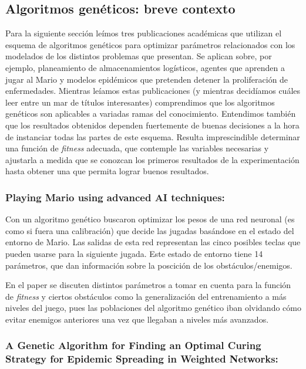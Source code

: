 \subsection{Algoritmos genéticos: breve contexto}

Para la siguiente sección leímos tres publicaciones académicas que utilizan el esquema de algoritmos genéticos para optimizar parámetros relacionados con los modelados de los distintos problemas que presentan. Se aplican sobre, por ejemplo, planeamiento de almacenamientos logísticos\cite{warehouse}, agentes que aprenden a jugar al Mario\cite{mario} y modelos epidémicos que pretenden detener la proliferación de enfermedades\cite{epidemic}. Mientras leíamos estas publicaciones (y mientras decidíamos cuáles leer entre un mar de títulos interesantes) comprendimos que los algoritmos genéticos son aplicables a variadas ramas del conocimiento. Entendimos también que los resultados obtenidos dependen fuertemente de buenas decisiones a la hora de instanciar todas las partes de este esquema. Resulta imprescindible determinar una función de \emph{fitness} adecuada, que contemple las variables necesarias y ajustarla a medida que se conozcan los primeros resultados de la experimentación hasta obtener una que permita lograr buenos resultados.


\subsubsection*{Playing Mario using advanced AI techniques:}

Con un algoritmo genético buscaron optimizar los pesos de una red neuronal (es como si fuera una calibración) que decide las
jugadas basándose en el estado del entorno de Mario. Las salidas de esta red representan las cinco posibles teclas que pueden
usarse para la siguiente jugada.
Este estado de entorno tiene 14 parámetros, que dan información sobre la poscición de los obstáculos/enemigos.


En el paper se discuten distintos parámetros a tomar en cuenta para la función de \emph{fitness} y ciertos obstáculos como
la generalización del entrenamiento a más niveles del juego, pues las poblaciones del algoritmo genético iban olvidando cómo
 evitar enemigos anteriores una vez que llegaban a niveles más avanzados.

\subsubsection*{A Genetic Algorithm for Finding an Optimal Curing Strategy for Epidemic Spreading in Weighted Networks:}

